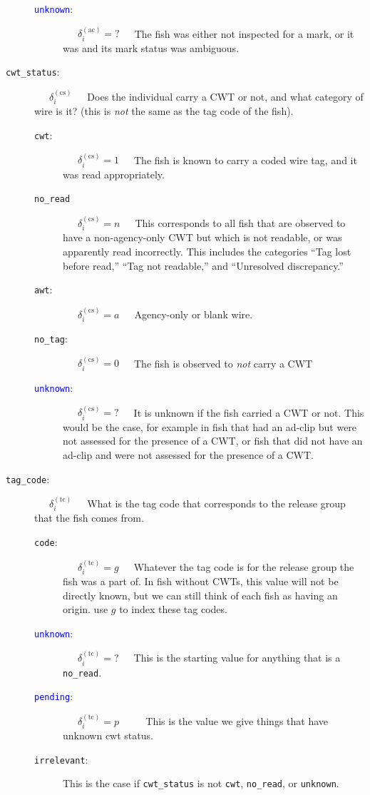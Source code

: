 \documentclass[11pt]{article}
\begin{document}
\begin{description}
\begin{description}
		\item [\textcolor{blue}{{\tt unknown}}:]  ~~~$\delta_i^{(\mathrm{ac})} = \mbox{?}$~~~The fish was either not
		inspected for a mark, or it was and its mark status was ambiguous.
	\end{description}
	\item [{\tt cwt\_status}:] ~~~$\delta_i^{(\mathrm{cs})}$~~~Does the individual carry a CWT or not, and what category of wire is
	it? (this is {\em not} the same as the tag code of the fish).
	\begin{description}
		\item [{\tt cwt}:] ~~~$\delta_i^{(\mathrm{cs})} = 1$~~~The fish is known to carry a coded wire tag, and it
		was read appropriately.
		\item [{\tt no\_read}] ~~~$\delta_i^{(\mathrm{cs})} = n$~~~This corresponds to all fish that
		are observed to have a non-agency-only CWT but which is not readable, or was apparently read incorrectly.  This 
		includes the categories ``Tag lost before read,'' ``Tag not readable,'' 
		and ``Unresolved discrepancy.''
		\item [{\tt awt}:] ~~~$\delta_i^{(\mathrm{cs})} = a$~~~Agency-only or blank wire.
		\item [{\tt no\_tag}:] ~~~$\delta_i^{(\mathrm{cs})} = 0$~~~The fish is observed to {\em not} carry a CWT
		\item [\textcolor{blue}{{\tt unknown}}:] ~~~$\delta_i^{(\mathrm{cs})} = \mbox{?}$~~~It is unknown if the fish carried a CWT or not.  This would be the case, for example
		in fish that had an ad-clip but were not assessed for the presence of a CWT, or fish that did not have
		an ad-clip and were not assessed for the presence of a CWT.
	\end{description}
	\item [{\tt tag\_code}:] ~~~$\delta_i^{(\mathrm{tc})}$~~~What is the tag code that corresponds to the release group that the fish comes from.
	\begin{description}
		\item [{\tt code}:] ~~~$\delta_i^{(\mathrm{tc})} = g$~~~Whatever the tag code is for the release group the fish was a part of.  In fish without CWTs, this value will not be directly known, but we can still think of each
		fish as having an origin.
		use $g$ to index these tag codes.
		\item [\textcolor{blue}{{\tt unknown}}:] ~~~$\delta_i^{(\mathrm{tc})} = \mbox{?}$~~~This is the starting value
		for anything that is a {\tt no\_read}.
		\item [\textcolor{blue}{{\tt pending}}:] ~~~$\delta_i^{(\mathrm{tc})} = p$ ~~~~ This is the value we give things
		that have unknown cwt status.  
		\item [{\tt irrelevant}:] This is the case if {\tt cwt\_status} is not {\tt cwt}, {\tt no\_read}, or {\tt unknown}.  
	\end{description}
\end{description}
\end{document}

